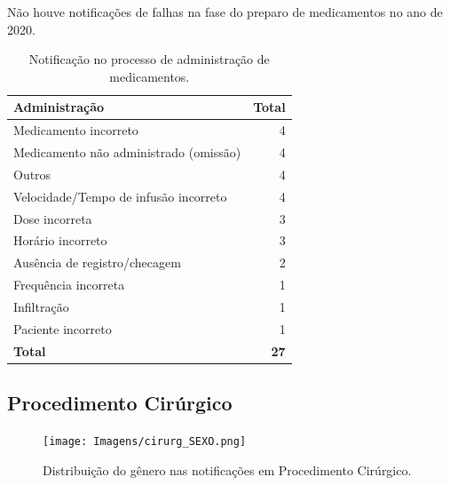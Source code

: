 \documentclass[
  a4paper]{article}
\begin{document}
\hspace{1cm} Não houve notificações de falhas na fase do preparo de
medicamentos no ano de 2020.

\begin{table}[H]

\caption{\label{tab:unnamed-chunk-15}Notificação no processo de administração de medicamentos.}
\centering
\begin{tabular}[t]{lr}
\toprule
Administração & Total\\
\midrule
Medicamento incorreto & 4\\
Medicamento não administrado (omissão) & 4\\
Outros & 4\\
Velocidade/Tempo de infusão incorreto & 4\\
Dose incorreta & 3\\
\addlinespace
Horário incorreto & 3\\
Ausência de registro/checagem & 2\\
Frequência incorreta & 1\\
Infiltração & 1\\
Paciente incorreto & 1\\
\midrule
\addlinespace
\textbf{Total} & \textbf{27}\\
\bottomrule
\end{tabular}
\end{table}

\subsection{Procedimento Cirúrgico}

\begin{figure}[H]
\caption{Distribuição do gênero nas notificações em Procedimento Cirúrgico.}
\texttt{[image: Imagens/cirurg\_SEXO.png]}
\end{figure}

\begin{table}[H]

\caption{\label{tab:unnamed-chunk-17}Notificação de acordo com as fases do Procedimento Cirúrgico.}
\centering
{}
\end{table}
\end{document}
